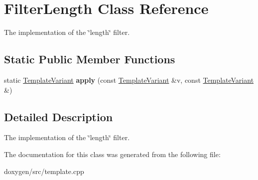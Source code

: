 \hypertarget{class_filter_length}{}\section{Filter\+Length Class Reference}
\label{class_filter_length}


The implementation of the \char`\"{}length\char`\"{} filter.  


\subsection*{Static Public Member Functions}
\begin{DoxyCompactItemize}
\item 
\mbox{\label{class_filter_length_aeabf52950c62b39af24d448bb5597551}} 
static \mbox{\hyperlink{class_template_variant}{Template\+Variant}} {\bfseries apply} (const \mbox{\hyperlink{class_template_variant}{Template\+Variant}} \&v, const \mbox{\hyperlink{class_template_variant}{Template\+Variant}} \&)
\end{DoxyCompactItemize}


\subsection{Detailed Description}
The implementation of the \char`\"{}length\char`\"{} filter. 

The documentation for this class was generated from the following file\+:\begin{DoxyCompactItemize}
\item 
doxygen/src/template.\+cpp\end{DoxyCompactItemize}
